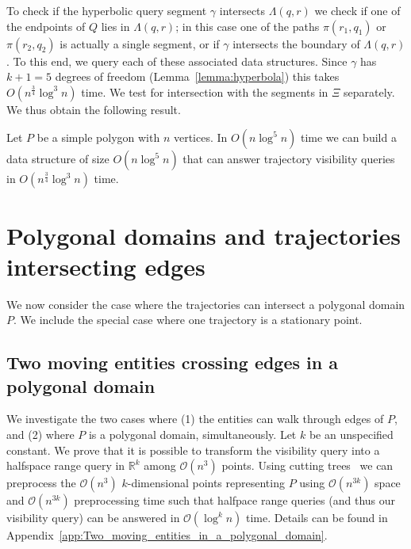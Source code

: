 \documentclass[UKenglish]{lipics-v2019}
\newcommand{\myremark}[4]{\textcolor{blue}{\textsc{#1 #2:}} \textcolor{#4}{\textsf{#3}}}
\newcommand{\frank}[2][says]{\myremark{Frank}{#1}{#2}{SeaGreen}}
\renewcommand{\myremark}[4]{}
\newcommand{\geod}{\pi\xspace}
\begin{document}
To check if the hyperbolic query segment $\gamma$ intersects $\Lambda(q,r)$ we
check if one of the endpoints of $Q$ lies in $\Lambda(q,r)$; in this case one
of the paths $\geod(r_1,q_1)$ or $\geod(r_2,q_2)$ is actually a single segment,
or if $\gamma$ intersects the boundary of $\Lambda(q,r)$. To this end, we query
each of these associated data structures. Since $\gamma$ has $k+1 = 5$ degrees of
freedom (Lemma~\ref{lemma:hyperbola}) this takes $O(n^{\frac{3}{4}}\log^3 n)$ time. We
test for intersection with the segments in $\Xi$ separately. We thus obtain the
following result.

\begin{theorem}
  \label{thm:data_structure_two_moving_monkeys_simple_polygon}
  Let $P$ be a simple polygon with $n$ vertices. In $O(n\log^5 n)$ time we can
  build a data structure of size $O(n\log^5 n)$ that can answer trajectory
  visibility queries in $O(n^{\frac{3}{4}}\log^3 n)$ time.
\end{theorem}

\section{Polygonal domains and trajectories intersecting edges}
\label{sec:variants}

We now consider the case where the trajectories can intersect a polygonal domain $P$. We include the special case where one trajectory is a stationary point.

\subsection{Two moving entities crossing edges in a polygonal domain}
\label{sub:Polygonal_Domain}

We investigate the two cases where (1) the entities can walk through
edges of $P$, and (2) where $P$ is a polygonal domain, simultaneously. Let $k$
be an unspecified constant. We prove that it is possible to transform the visibility query into a halfspace range query in $\mathbb{R}^k$ among $\mathcal{O}(n^3)$ points. Using cutting trees~\cite{chazelle1993cutting} we can preprocess the $\mathcal{O}(n^3)$ $k$-dimensional points representing $P$ using $\mathcal{O}(n^{3k})$ space and $\mathcal{O}(n^{3k})$ preprocessing time such that halfpace range queries (and thus our visibility query) can be answered in $\mathcal{O}(\log^k n)$ time.
Details can be found in Appendix~\ref{app:Two_moving_entities_in_a_polygonal_domain}. 
\end{document}
